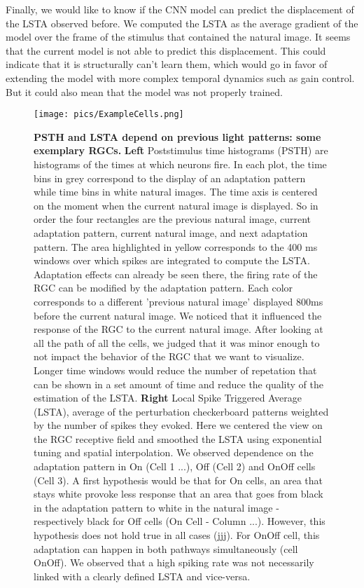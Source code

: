 Finally, we would like to know if the CNN model can predict the displacement of
the LSTA observed before. We computed the LSTA as the average gradient of the
model over the frame of the stimulus that contained the natural image. It seems
that the current model is not able to predict this displacement. This could
indicate that it is structurally can't learn them, which would go in favor of
extending the model with more complex temporal dynamics such as gain control.
But it could also mean that the model was not properly trained.


\begin{figure}
    \centering
    \texttt{[image: pics/ExampleCells.png]}
    \caption{\textbf{PSTH and LSTA depend on previous light patterns: some exemplary RGCs.} \textbf{Left} Poststimulus time histograms (PSTH) are histograms of the times at which neurons fire. In each plot, the time bins in grey correspond to the display of an adaptation pattern while time bins in white natural images.
        The time axis is centered on the moment when the current natural image is displayed. So in order the four rectangles are the previous natural image, current adaptation pattern, current natural image, and next adaptation pattern. The area highlighted in yellow corresponds to the 400 ms windows over which spikes are integrated to compute the LSTA. Adaptation effects can already be seen there, the firing rate of the RGC can be modified by the adaptation pattern.
        Each color corresponds to a different 'previous natural image' displayed 800ms before the current natural image. We noticed that it influenced the response of the RGC to the current natural image. After looking at all the path of all the cells, we judged that it was minor enough to not impact the behavior of the RGC that we want to visualize. Longer time windows would reduce the number of repetation that can be shown in a set amount of time and reduce the quality of the estimation of the LSTA.
        \textbf{Right} Local Spike Triggered Average (LSTA), average of the perturbation checkerboard patterns weighted by the number of spikes they evoked. Here we centered the view on the RGC receptive field and smoothed the LSTA using exponential tuning and spatial interpolation. We observed dependence on the adaptation pattern in On (Cell 1 ...), Off (Cell 2) and OnOff cells (Cell 3). A first hypothesis would be that for On cells, an area that stays white provoke less response that an area that goes from black in the adaptation pattern to white in the natural image - respectively black for Off cells (On Cell - Column ...).
        However, this hypothesis does not hold true in all cases (jjj). For OnOff cell, this adaptation can happen in both pathways simultaneously (cell OnOff). We observed that a high spiking rate was not necessarily linked with a clearly defined LSTA and vice-versa. }
    \label{fig:CellExample}
\end{figure}